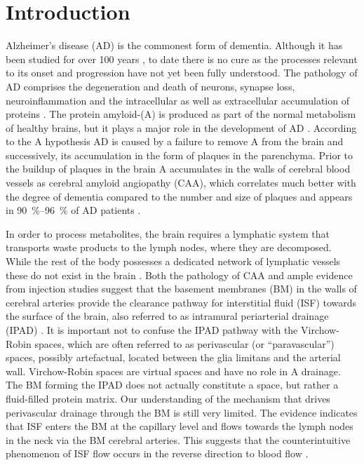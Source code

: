\documentclass{frontiersFPHY} %
\newcommand{\Ab}{A\textbeta\xspace}
\begin{document}
\section{Introduction}

Alzheimer's disease (AD) is the commonest form of dementia. Although it has been studied for over 100 years \cite{Selkoe2001}, to date there is no cure as the processes relevant to its onset and progression have not yet been fully understood. The pathology of AD comprises the degeneration and death of neurons, synapse loss, neuroinflammation and the intracellular as well as extracellular accumulation of proteins \cite{Koffie2011}. The protein amyloid-\textbeta\xspace (\Ab) is produced as part of the normal metabolism of healthy brains, but it plays a major role in the development of AD \cite{Haass1992}. According to the \Ab hypothesis AD is caused by a failure to remove \Ab from the brain and successively, its accumulation in the form of plaques in the parenchyma. Prior to the buildup of plaques in the brain \Ab accumulates in the walls of cerebral blood vessels as cerebral amyloid angiopathy (CAA), which correlates much better with the degree of dementia compared to the number and size of plaques and appears in \SIrange{90}{96}{\percent} of AD patients \cite{Weller2006, Weller2009}.

In order to process metabolites, the brain requires a lymphatic system that transports waste products to the lymph nodes, where they are decomposed. While the rest of the body possesses a dedicated network of lymphatic vessels these do not exist in the brain \cite{Weller2010}. Both the pathology of CAA and ample evidence from injection studies suggest that the basement membranes (BM) in the walls of cerebral arteries provide the clearance pathway for interstitial fluid (ISF) towards the surface of the brain, also referred to as intramural periarterial drainage (IPAD) \cite{Weller2010,Carare2008,Hawkes2011,Morris2014}. It is important not to confuse the IPAD pathway with the Virchow-Robin spaces, which are often referred to as perivascular (or ``paravascular'') spaces, possibly artefactual, located between the glia limitans and the arterial wall. Virchow-Robin spaces are virtual spaces and have no role in \Ab drainage. The BM forming the IPAD does not actually constitute a space, but rather a fluid-filled protein matrix. Our understanding of the mechanism that drives perivascular drainage through the BM is still very limited. The evidence indicates that ISF enters the BM at the capillary level and flows towards the lymph nodes in the neck via the BM cerebral arteries. This suggests that the counterintuitive phenomenon of ISF flow occurs in the reverse direction to blood flow \cite{Carare2008}.
\end{document}
